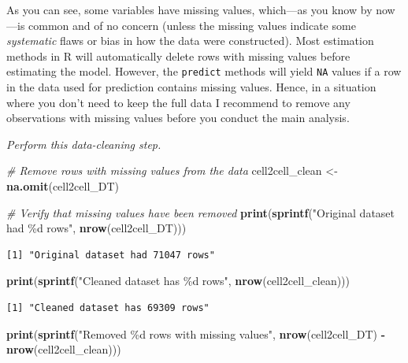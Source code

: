 \documentclass[
]{article}
\newenvironment{Shaded}{\begin{snugshade}}{\end{snugshade}}
\newcommand{\CommentTok}[1]{\textcolor[rgb]{0.56,0.35,0.01}{\textit{#1}}}
\newcommand{\FunctionTok}[1]{\textcolor[rgb]{0.13,0.29,0.53}{\textbf{#1}}}
\newcommand{\NormalTok}[1]{#1}
\newcommand{\OtherTok}[1]{\textcolor[rgb]{0.56,0.35,0.01}{#1}}
\newcommand{\SpecialCharTok}[1]{\textcolor[rgb]{0.81,0.36,0.00}{\textbf{#1}}}
\newcommand{\StringTok}[1]{\textcolor[rgb]{0.31,0.60,0.02}{#1}}
\begin{document}
As you can see, some variables have missing values, which---as you know
by now---is common and of no concern (unless the missing values indicate
some \emph{systematic} flaws or bias in how the data were constructed).
Most estimation methods in R will automatically delete rows with missing
values before estimating the model. However, the \texttt{predict}
methods will yield \texttt{NA} values if a row in the data used for
prediction contains missing values. Hence, in a situation where you
don't need to keep the full data I recommend to remove any observations
with missing values before you conduct the main analysis.

\emph{Perform this data-cleaning step.}

\begin{Shaded}
\begin{Highlighting}[]
\CommentTok{\# Remove rows with missing values from the data}
\NormalTok{cell2cell\_clean }\OtherTok{\textless{}{-}} \FunctionTok{na.omit}\NormalTok{(cell2cell\_DT)}

\CommentTok{\# Verify that missing values have been removed}
\FunctionTok{print}\NormalTok{(}\FunctionTok{sprintf}\NormalTok{(}\StringTok{"Original dataset had \%d rows"}\NormalTok{, }\FunctionTok{nrow}\NormalTok{(cell2cell\_DT)))}
\end{Highlighting}
\end{Shaded}

\begin{verbatim}
[1] "Original dataset had 71047 rows"
\end{verbatim}

\begin{Shaded}
\begin{Highlighting}[]
\FunctionTok{print}\NormalTok{(}\FunctionTok{sprintf}\NormalTok{(}\StringTok{"Cleaned dataset has \%d rows"}\NormalTok{, }\FunctionTok{nrow}\NormalTok{(cell2cell\_clean)))}
\end{Highlighting}
\end{Shaded}

\begin{verbatim}
[1] "Cleaned dataset has 69309 rows"
\end{verbatim}

\begin{Shaded}
\begin{Highlighting}[]
\FunctionTok{print}\NormalTok{(}\FunctionTok{sprintf}\NormalTok{(}\StringTok{"Removed \%d rows with missing values"}\NormalTok{, }\FunctionTok{nrow}\NormalTok{(cell2cell\_DT) }\SpecialCharTok{{-}} \FunctionTok{nrow}\NormalTok{(cell2cell\_clean)))}
\end{Highlighting}
\end{Shaded}
\end{document}
